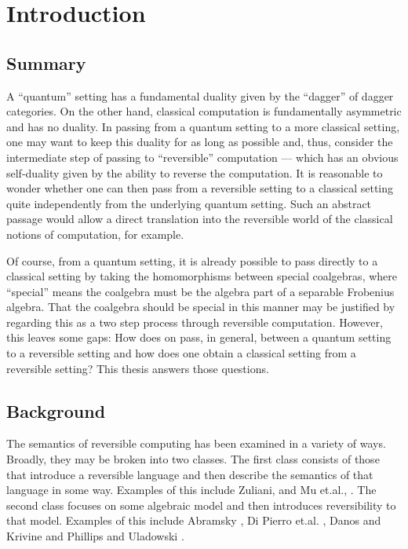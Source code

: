 \chapter{Introduction}\label{chap:introduction}
\section{Summary}\label{sec:summary}
A ``quantum'' setting has a fundamental duality given by the ``dagger'' of dagger
categories\cite{selinger05:dagger,abramsky05:abstractscalars}. On the other hand, classical
computation is fundamentally asymmetric and has no duality. In passing from a quantum setting to a more classical setting, one
may want to keep this duality for as long as possible and, thus, consider the intermediate step of
passing to ``reversible'' computation --- which has an obvious self-duality given by the ability to
reverse the computation. It is reasonable to
wonder whether one can then pass from a reversible setting to a classical setting quite
independently from the underlying quantum setting. Such an abstract
passage would allow a direct translation into the reversible world of the classical notions of
computation, for example.

Of course, from a quantum setting, it is already possible to pass directly to a classical setting by
taking the homomorphisms between special coalgebras, where ``special'' means the coalgebra must be
the algebra part of a separable Frobenius algebra. That the coalgebra should be special in this manner
may be justified by regarding this as a two step process through reversible computation. However,
this leaves some gaps: How does on pass, in general, between a quantum setting to a reversible
setting and how does one obtain a classical setting from a reversible setting? This thesis answers
those questions.
\section{Background}
\label{sec:background}

The semantics of reversible computing has been examined in a variety of ways. Broadly, they may be
broken into two classes. The first class consists of those that introduce a reversible
language and then describe the semantics of that language in some way. Examples of this include
Zuliani, \cite{zuliani01:reversibility} and Mu et.al., \cite{muetal04:injreversible}. The second
class focuses on some algebraic model and then introduces reversibility to that model. Examples of this
include Abramsky \cite{abramsky05:reversible}, Di Pierro et.al. \cite{DiPierro200625}, Danos and
Krivine \cite{danos2004reversible} and Phillips and Uladowski \cite{phillips2006operational}.

